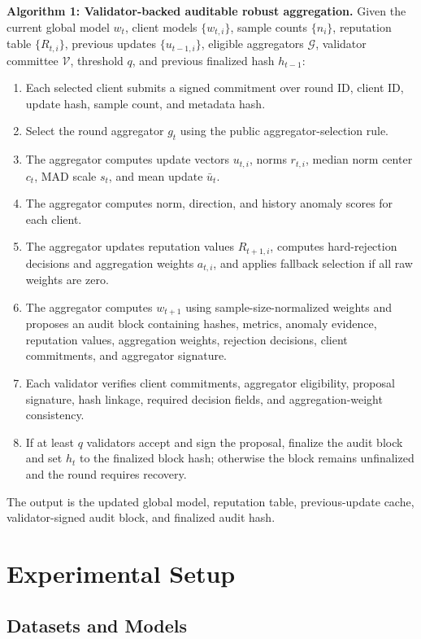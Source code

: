 \documentclass[preprint,authoryear,12pt]{elsarticle}
\begin{document}
\noindent\textbf{Algorithm 1: Validator-backed auditable robust aggregation.}
Given the current global model $w_t$, client models $\{w_{t,i}\}$, sample counts $\{n_i\}$, reputation table $\{R_{t,i}\}$, previous updates $\{u_{t-1,i}\}$, eligible aggregators $\mathcal{G}$, validator committee $\mathcal{V}$, threshold $q$, and previous finalized hash $h_{t-1}$:
\begin{enumerate}
  \item Each selected client submits a signed commitment over round ID, client ID, update hash, sample count, and metadata hash.
  \item Select the round aggregator $g_t$ using the public aggregator-selection rule.
  \item The aggregator computes update vectors $u_{t,i}$, norms $r_{t,i}$, median norm center $c_t$, MAD scale $s_t$, and mean update $\bar{u}_t$.
  \item The aggregator computes norm, direction, and history anomaly scores for each client.
  \item The aggregator updates reputation values $R_{t+1,i}$, computes hard-rejection decisions and aggregation weights $a_{t,i}$, and applies fallback selection if all raw weights are zero.
  \item The aggregator computes $w_{t+1}$ using sample-size-normalized weights and proposes an audit block containing hashes, metrics, anomaly evidence, reputation values, aggregation weights, rejection decisions, client commitments, and aggregator signature.
  \item Each validator verifies client commitments, aggregator eligibility, proposal signature, hash linkage, required decision fields, and aggregation-weight consistency.
  \item If at least $q$ validators accept and sign the proposal, finalize the audit block and set $h_t$ to the finalized block hash; otherwise the block remains unfinalized and the round requires recovery.
\end{enumerate}
The output is the updated global model, reputation table, previous-update cache, validator-signed audit block, and finalized audit hash.

\section{Experimental Setup}

\subsection{Datasets and Models}
\end{document}
